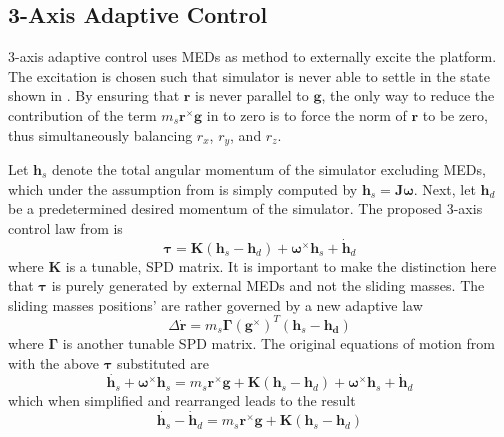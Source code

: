 \subsection{3-Axis Adaptive Control}\label{sec:3_axis_adaptive}
3-axis adaptive control uses MEDs as method to externally excite the platform. The excitation is chosen such that simulator is never able to settle in the state shown in . By ensuring that $\bm{r}$ is never parallel to $\bm{g}$, the only way to reduce the contribution of the term $m_s\bm{r}^{\times}\bm{g}$ in  to zero is to force the norm of $\bm{r}$ to be zero, thus simultaneously balancing $r_x$, $r_y$, and $r_z$. 

Let $\bm{h}_s$ denote the total angular momentum of the simulator excluding MEDs, which under the assumption from  is simply computed by $\bm{h}_s=\bm{J\omega}$. Next, let $\bm{h}_d$ be a predetermined desired momentum of the simulator. The proposed 3-axis control law from \cite{kim_automatic_2009} is
\begin{equation}
    \bm{\tau}=\bm{K}(\bm{h}_s-\bm{h}_d)+\bm{\omega}^{\times}\bm{h}_s+\dot{\bm{h}}_d
\end{equation}
where $\bm{K}$ is a tunable, SPD matrix. It is important to make the distinction here that $\bm{\tau}$ is purely generated by external MEDs and not the sliding masses. The sliding masses positions' are rather governed by a new adaptive law
\begin{equation}\label{equation:3_axis_adaptive_law}
    \Delta\dot{\bm{r}}=m_s\bm{\Gamma}(\bm{g}^{\times})^T(\bm{h}_s-\bm{h_d})
\end{equation}
where $\bm{\Gamma}$ is another tunable SPD matrix. The original equations of motion from  with the above $\bm{\tau}$ substituted are
\begin{equation}
    \dot{\bm{h}_s}+\bm{\omega}^{\times}\bm{h}_s=m_s\bm{r}^{\times}\bm{g}+
    \bm{K}(\bm{h}_s-\bm{h}_d)+\bm{\omega}^{\times}\bm{h}_s+\dot{\bm{h}}_d
\end{equation}
which when simplified and rearranged leads to the result
\begin{equation}\label{equation:h_dot_result}
    \dot{\bm{h}_s}-\dot{\bm{h}}_d=m_s\bm{r}^{\times}\bm{g}+
    \bm{K}(\bm{h}_s-\bm{h}_d)
\end{equation}

